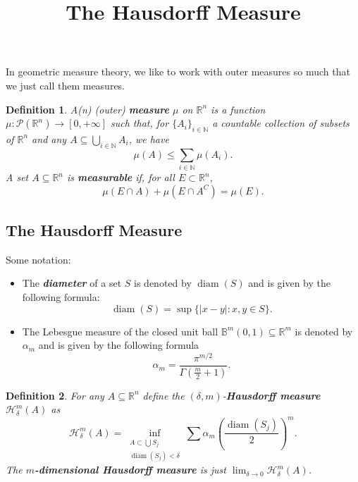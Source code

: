 \documentclass[10pt]{article}
\title{\textbf{The Hausdorff Measure}}
\date{}
\theoremstyle{plain}
\newtheorem{definition}{Definition}
\DeclareMathOperator{\diam}{diam}
\begin{document}
	\maketitle 
	
In geometric measure theory, we like to work with outer measures so much that we just call them measures. 
	\begin{definition}
		A(n) (outer) \textbf{\textit{measure}} $\mu$ on $\mathbb{R}^n$ is a function $\mu: \mathcal{P}(\mathbb{R}^n) \to [0, + \infty]$ such that, for $\{A_i\}_{i \in \mathbb{N}}$ a countable collection of subsets of $\mathbb{R}^n$ and any $A \subseteq \bigcup_{i \in \mathbb{N}} A_i$, we have $$\mu(A) \leq \sum_{i \in \mathbb{N}} \mu(A_i).$$ A set $A \subseteq \mathbb{R}^n$ is \textbf{\textit{measurable}} if, for all $E \subset \mathbb{R}^n$, $$\mu(E \cap A) + \mu(E \cap A^C) = \mu(E).$$
	\end{definition}

	
\subsection*{The Hausdorff Measure}
	Some notation:	
		\begin{itemize}
			\item The \textbf{\textit{diameter}} of a set $S$ is denoted by $\diam(S)$ and is given by the following formula: $$\diam(S) = \sup \{|x - y| : x, y \in S\}.$$ 
			
			\item The Lebesgue measure of the closed unit ball $\mathbb{B}^m(0, 1) \subseteq \mathbb{R}^m$ is denoted by $\alpha_m$ and is given by the following formula $$\alpha_m = \frac{\pi^{m/2}}{\Gamma\left(\frac{m}{2} + 1\right)}.$$ 
		\end{itemize}
	\begin{definition}
		For any $A \subseteq \mathbb{R}^n$ define the $(\delta, m)$-\textbf{\textit{Hausdorff measure}} $\mathcal{H}_\delta^m(A)$ as $$\mathcal{H}_\delta^m(A) = \inf_{\substack{A \subset \bigcup S_j \\ \diam(S_j) < \delta}} \sum \alpha_m \left(\frac{\diam(S_j)}{2}\right)^m.$$ The \textbf{\textit{$m$-dimensional Hausdorff measure}} is just $\lim_{\delta \to 0} \mathcal{H}_{\delta}^m(A)$. 
	\end{definition}
\end{document}
